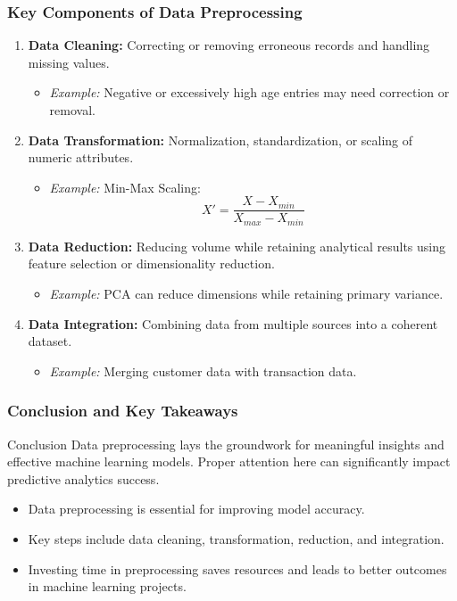 \documentclass[aspectratio=169]{beamer}
\begin{document}
\begin{frame}[fragile]
    \frametitle{Key Components of Data Preprocessing}
    \begin{enumerate}
        \item \textbf{Data Cleaning:} 
        Correcting or removing erroneous records and handling missing values.
        \begin{itemize}
            \item \textit{Example:} Negative or excessively high age entries may need correction or removal.
        \end{itemize}
        
        \item \textbf{Data Transformation:} 
        Normalization, standardization, or scaling of numeric attributes.
        \begin{itemize}
            \item \textit{Example:} Min-Max Scaling:
            \begin{equation}
            X' = \frac{X - X_{min}}{X_{max} - X_{min}}
            \end{equation}
        \end{itemize}
        
        \item \textbf{Data Reduction:} 
        Reducing volume while retaining analytical results using feature selection or dimensionality reduction.
        \begin{itemize}
            \item \textit{Example:} PCA can reduce dimensions while retaining primary variance.
        \end{itemize}
        
        \item \textbf{Data Integration:} 
        Combining data from multiple sources into a coherent dataset.
        \begin{itemize}
            \item \textit{Example:} Merging customer data with transaction data.
        \end{itemize}
    \end{enumerate}
\end{frame}

\begin{frame}[fragile]
    \frametitle{Conclusion and Key Takeaways}
    \begin{block}{Conclusion}
        Data preprocessing lays the groundwork for meaningful insights and effective machine learning models. Proper attention here can significantly impact predictive analytics success.
    \end{block}
    \begin{itemize}
        \item Data preprocessing is essential for improving model accuracy.
        \item Key steps include data cleaning, transformation, reduction, and integration.
        \item Investing time in preprocessing saves resources and leads to better outcomes in machine learning projects.
    \end{itemize}
\end{frame}
\end{document}
